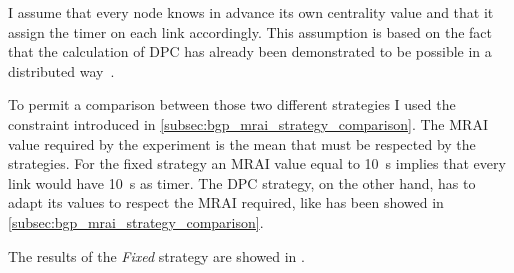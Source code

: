 I assume that every node knows in advance its own centrality value and that it
assign the timer on each link accordingly.
This assumption is based on the fact that the calculation of \ac{DPC} has
already been demonstrated to be possible in a distributed way~\cite{milani2019BGP}.

To permit a comparison between those two different strategies I used the
constraint introduced in \cref{subsec:bgp_mrai_strategy_comparison}.
The \ac{MRAI} value required by the experiment is the mean that must be respected
by the strategies.
For the fixed strategy an \ac{MRAI} value equal to \SI{10}{\second} implies that
every link would have \SI{10}{\second} as timer.
The \ac{DPC} strategy, on the other hand, has to adapt its values to respect the
\ac{MRAI} required, like has been showed in \cref{subsec:bgp_mrai_strategy_comparison}.

The results of the \textit{Fixed} strategy are showed in
.

